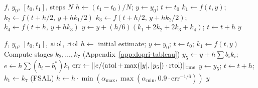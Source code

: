 \documentclass[11pt]{article}
\begin{document}
\begin{algorithm}[h]
\caption{RK4}
\begin{algorithmic}[1]
\REQUIRE $f$, $y_0$, $[t_0,t_1]$, steps $N$
\STATE $h\gets(t_1-t_0)/N$;\; $y\gets y_0$;\; $t\gets t_0$
  \STATE $k_1\gets f(t,y)$;\;
         $k_2\gets f(t{+}h/2,\,y{+}hk_1/2)$
  \STATE $k_3\gets f(t{+}h/2,\,y{+}hk_2/2)$;\;
         $k_4\gets f(t{+}h,\,y{+}hk_3)$
  \STATE $y\gets y+(h/6)(k_1+2k_2+2k_3+k_4)$;\; $t\gets t+h$
\ENDFOR
\RETURN $y$
\end{algorithmic}
\end{algorithm}

\begin{algorithm}[h]
\caption{DOPRI5 (adaptive)}
\begin{algorithmic}[1]
\REQUIRE $f$, $y_0$, $[t_0,t_1]$, $\operatorname{atol}$, $\operatorname{rtol}$
\STATE $h\gets$ initial estimate;\; $y\gets y_0$;\; $t\gets t_0$;\;
       $k_1\gets f(t,y)$
  \STATE Compute stages $k_2,\dots,k_7$ (Appendix~\ref{app:dopri-tableau})
  \STATE $y_5\gets y+h\sum b_ik_i$;\;
         $e\gets h\sum(b_i{-}b_i^*)k_i$
  \STATE $\mathrm{err}\gets\|e/(\operatorname{atol}+\max(|y|,|y_5|)\cdot\operatorname{rtol})\|_{\mathrm{rms}}$
    \STATE $y\gets y_5$;\; $t\gets t+h$;\; $k_1\gets k_7$ (FSAL)
  \ENDIF
  \STATE $h\gets h\cdot\min(\alpha_{\max},\max(\alpha_{\min},0.9\cdot\mathrm{err}^{-1/6}))$
\ENDWHILE
\RETURN $y$
\end{algorithmic}
\end{algorithm}
\end{document}
